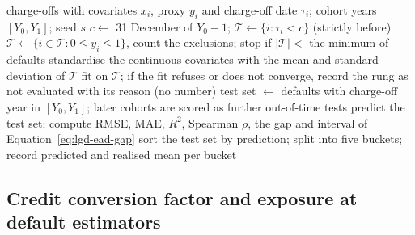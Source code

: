 \begin{algorithm}[htbp]
\caption{The ladder for one default cohort $[Y_0,Y_1]$ of case C08.}
\label{alg:lgd-ead-ladder}
\begin{algorithmic}[1]
\Require charge-offs with covariates $x_i$, proxy $y_i$ and charge-off date $\tau_i$; cohort years $[Y_0,Y_1]$; seed $s$
\State $c\gets$ 31 December of $Y_0-1$; $\mathcal T\gets\{i:\tau_i<c\}$ (strictly before)
\State $\mathcal T\gets\{i\in\mathcal T:0\le y_i\le 1\}$, count the exclusions; stop if $|\mathcal T|<$ the minimum of defaults
\State standardise the continuous covariates with the mean and standard deviation of $\mathcal T$
  \State fit on $\mathcal T$; if the fit refuses or does not converge, record the rung as not evaluated with its reason (no number)
\EndFor
\State test set $\gets$ defaults with charge-off year in $[Y_0,Y_1]$; later cohorts are scored as further out-of-time tests
  \State predict the test set; compute RMSE, MAE, $R^{2}$, Spearman $\rho$, the gap and interval of Equation~\eqref{eq:lgd-ead-gap}
  \State sort the test set by prediction; split into five buckets; record predicted and realised mean per bucket
\EndFor
\end{algorithmic}
\end{algorithm}

\subsection{Credit conversion factor and exposure at default estimators}
\label{sec:m15}

